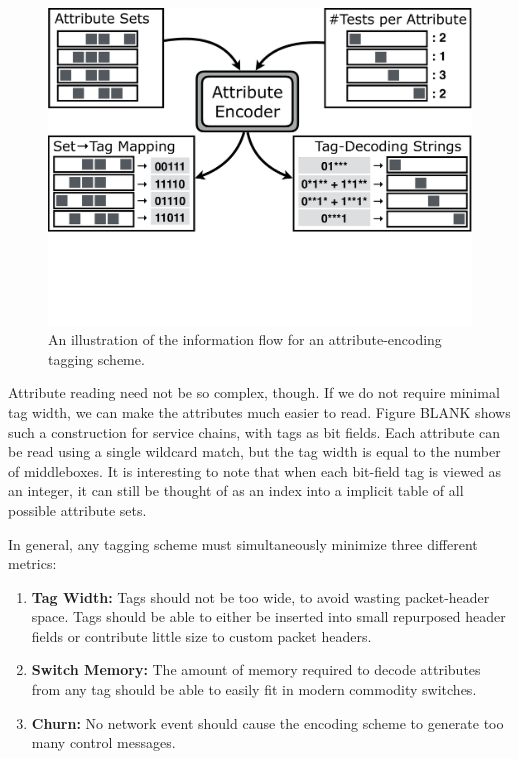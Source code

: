 \begin{figure}[t!] 
\begin{minipage}{1\linewidth}
\includegraphics[trim={0 8cm 0 0}, clip, width=\linewidth]{figures/system_flow2}
\end{minipage} 
\caption{An illustration of the information flow for an attribute-encoding tagging scheme.}
\label{fig:system_flow}
\end{figure}

Attribute reading need not be so complex, though. If we do not require minimal tag width, we can make the attributes much easier to read. Figure BLANK shows such a construction for service chains, with tags as bit fields. Each attribute can be read using a single wildcard match, but the tag width is equal to the number of middleboxes. It is interesting to note that when each bit-field tag is viewed as an integer, it can still be thought of as an index into a implicit table of all possible attribute sets. 

In general, any tagging scheme must simultaneously minimize three different metrics:
\begin{enumerate}
\item \textbf{Tag Width:} Tags should not be too wide, to avoid wasting packet-header space.
Tags should be able to either be inserted into small repurposed header fields or contribute little size to custom packet headers. 
\item \textbf{Switch Memory:} The amount of memory required to decode attributes from any tag should be able to easily fit in modern commodity switches.
\item \textbf{Churn:} No network event should cause the encoding scheme to generate too many control messages.
\end{enumerate}


